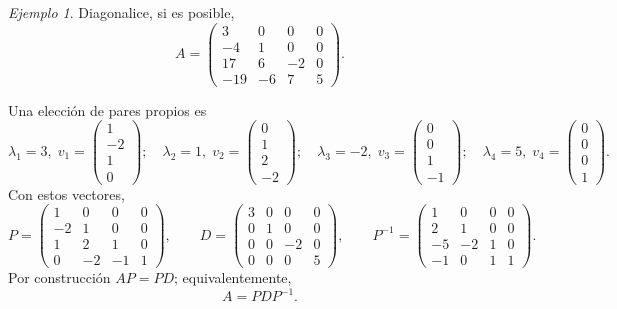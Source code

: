 \documentclass[12pt]{article}
\theoremstyle{remark}
\newtheorem{Ejem}[definicion]{Ejemplo}
\begin{document}
\begin{Ejem}


Diagonalice, si es posible,
\[
A=\begin{pmatrix}3 & 0 & 0 & 0\\-4 & 1 & 0 & 0\\17 & 6 & -2 & 0\\-19 & -6 & 7 & 5\end{pmatrix}.
\]

\scriptsize
Una elección de pares propios es
\[
\lambda_1=3,\;v_1=\begin{pmatrix}1\\-2\\1\\0\end{pmatrix};\quad \lambda_2=1,\;v_2=\begin{pmatrix}0\\1\\2\\-2\end{pmatrix};\quad \lambda_3=-2,\;v_3=\begin{pmatrix}0\\0\\1\\-1\end{pmatrix};\quad \lambda_4=5,\;v_4=\begin{pmatrix}0\\0\\0\\1\end{pmatrix}.
\]
Con estos vectores,
\[
P=\begin{pmatrix}1 & 0 & 0 & 0\\-2 & 1 & 0 & 0\\1 & 2 & 1 & 0\\0 & -2 & -1 & 1\end{pmatrix},\qquad D=\begin{pmatrix}3 & 0 & 0 & 0\\0 & 1 & 0 & 0\\0 & 0 & -2 & 0\\0 & 0 & 0 & 5\end{pmatrix},\qquad P^{-1}=\begin{pmatrix}1 & 0 & 0 & 0\\2 & 1 & 0 & 0\\-5 & -2 & 1 & 0\\-1 & 0 & 1 & 1\end{pmatrix}.
\]
Por construcción $AP=PD$; equivalentemente,
\[
\boxed{A=PDP^{-1}}.
\]

\end{Ejem}
\end{document}
